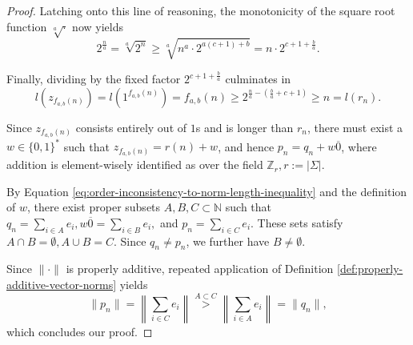 \begin{proof}
	Latching onto this line of reasoning, the monotonicity of the square root function $\sqrt[a]{\cdot}$ now yields
	\begin{equation}
	2^{\frac{n}{a}}=\sqrt[a]{2^{n}}\geq \sqrt[a]{ n^a \cdot 2^{a(c+1)+b}} =n \cdot 2^{c+1+\frac{b}{a}}.
	\end{equation}
	
	Finally, dividing by the fixed factor $2^{c+1+\frac{b}{a}}$ culminates in
	\begin{equation}
		\label{eq:order-inconsistency-to-norm-length-inequality}
		l\left(z_{f_{a,b}(n)}\right)=l\left(1^{f_{a,b}(n)}\right)=f_{a,b}(n)\geq 2^{ \frac{n}{a}- \left(\frac{b}{a}+c+1\right)}\geq n = l(r_n).
	\end{equation}
	
	Since $z_{f_{a,b}(n)}$ consists entirely out of $1$s and is longer than $r_n$, there must exist a $w\in\{0,1\}^{*}$ such that $z_{f_{a,b}(n)}=r(n)+w$, and hence $p_n=q_n+w\overline{0}$, where addition is element-wisely identified as over the field $\mathbb{Z}_{r}, r:=|\Sigma|$.
	
	By Equation \ref{eq:order-inconsistency-to-norm-length-inequality} and the definition of $w$, there exist proper subsets $A,B,C\subset \mathbb{N}$ such that $q_n = \sum_{i\in A}e_i, w\overline{0}=\sum_{i\in B}e_i,$ and $p_n = \sum_{i\in C}e_i$.
	These sets satisfy $A\cap B = \emptyset, A\cup B = C$.
	Since $q_n\neq p_n$, we further have $B\neq \emptyset$.
	
	Since $\lVert\cdot\rVert$ is properly additive, repeated application of Definition \ref{def:properly-additive-vector-norms} yields
	\begin{equation}
		\lVert p_n \rVert = \left\lVert \sum_{i\in C}e_i \right\rVert \overset{A\subset C}{>} \left\lVert \sum_{i\in A}e_i \right\rVert = \lVert q_n \rVert,
	\end{equation}
	which concludes our proof.
	
\end{proof}



